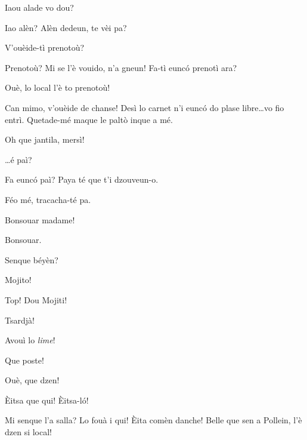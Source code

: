 \begin{drama}
\Dorinaspeaks Iaou alade vo dou?

\Pierrespeaks Iao alèn? Alèn dedeun, te vèi pa?

\Dorinaspeaks V'ouèide-tì prenotoù?

\Pierrespeaks Prenotoù? Mi se l'è vouido, n'a gneun! Fa-tì eunc\'o prenotì ara?

\Dorinaspeaks Ouè, lo local l'è to prenotoù!

\Dorinaspeaks Can mimo, v'ouèide de chanse! Desì lo carnet n'i eunc\'o do plase libre\ldots vo fio entrì. Quetade-mé maque le palt\`o inque a mé.

\Pierrespeaks Oh que jantila, mersì!


\Dorinaspeaks \ldots é paì?

\Pierrespeaks Fa eunc\'o paì? Paya té que t'i dzouveun-o.

\Louisspeaks Féo mé, tracacha-té pa.


\Pierrespeaks{} Bonsouar madame!

\Bertaspeaks{} Bonsouar.

\Pierrespeaks{} Senque béyèn?

\Louisspeaks Mojito!

\Pierrespeaks Top!  Dou Mojiti!

\Louisspeaks Tsardjà!

\Pierrespeaks Avouì lo \textit{lime}!


\Louisspeaks{} Que poste!

\Pierrespeaks{} Ouè, que dzen!


\Louisspeaks{} \`Eitsa que qui! \`Eitsa-l\'o!


\Pierrespeaks Mi senque l'a salla? Lo fouà i qui! \`Eita comèn danche! Belle que sen a Pollein, l'è dzen si local!


\end{drama}
